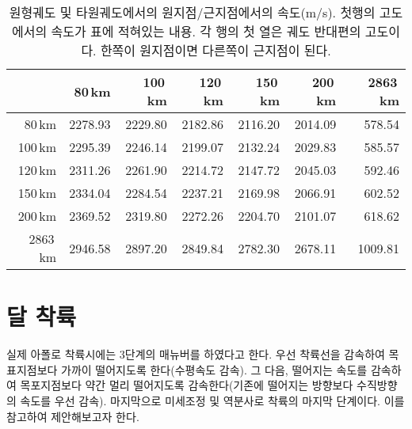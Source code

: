 \begin{table}[h]
\caption{원형궤도 및 타원궤도에서의 원지점/근지점에서의 속도(m/s). 첫행의 고도에서의 속도가 표에 적혀있는 내용. 각 행의 첫 열은 궤도 반대편의 고도이다. 한쪽이 원지점이면 다른쪽이 근지점이 된다.}
\begin{tabular}{|r|r|r|r|r|r|r|}
\hline
&80\,km&100\,km&120\,km&150\,km&200\,km&2863\,km
\\\hline
80\,km&2278.93&2229.80&2182.86&2116.20&2014.09&578.54%
\\\hline
100\,km&2295.39&2246.14&2199.07&2132.24&2029.83&585.57%
\\\hline
120\,km&2311.26&2261.90&2214.72&2147.72&2045.03&592.46%
\\\hline
150\,km&2334.04&2284.54&2237.21&2169.98&2066.91&602.52%
\\\hline
200\,km&2369.52&2319.80&2272.26&2204.70&2101.07&618.62%
\\\hline
2863\,km&2946.58&2897.20&2849.84&2782.30&2678.11&1009.81
\\\hline
\end{tabular}
\end{table}
\section{달 착륙}
실제 아폴로 착륙시에는 3단계의 매뉴버를 하였다고 한다. 우선 착륙선을 감속하여 목표지점보다 가까이 떨어지도록 한다(수평속도 감속). 그 다음, 떨어지는 속도를 감속하여 목포지점보다 약간 멀리 떨어지도록 감속한다(기존에 떨어지는 방향보다 수직방향의 속도를 우선 감속). 마지막으로 미세조정 및 역분사로 착륙의 마지막 단계이다. 이를 참고하여 제안해보고자 한다.
